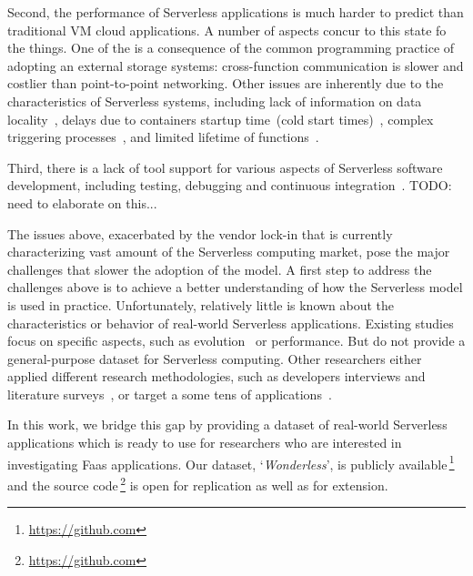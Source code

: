 Second, the performance of Serverless applications is much harder to 
predict than traditional VM cloud applications. A number of aspects concur 
to this state fo the things.
One of the is a consequence of the common programming practice
of adopting an external storage systems: cross-function communication 
is slower and costlier than point-to-point networking.
Other issues are inherently due to the characteristics of Serverless systems,
including lack of information on data locality~\cite{DBLP:journals/corr/abs-1902-03383},
delays due to containers startup time~(cold start times)~\cite{manner2018cold}, 
complex triggering processes~\cite{pelle2019towards}, and
limited lifetime of functions~\cite{hellerstein2018serverless}.

Third, there is a lack of tool support for various aspects of
Serverless software development, including testing, debugging 
and continuous integration~\cite{lenarduzzi2020serverless}.
TODO: need to elaborate on this...

The issues above, exacerbated by the vendor lock-in that is currently 
characterizing vast amount of the Serverless computing market, 
pose the major challenges that slower the adoption of the \faas model. 
A first step to address the challenges above is to achieve a 
better understanding of how the Serverless model is used in practice. 
Unfortunately, relatively little is known about the characteristics 
or behavior of real-world Serverless applications. Existing studies focus 
on specific aspects, such as evolution~\cite{spillner2019quantitative} 
or performance\cite{wang2018peeking,lloyd2018serverless}.
But do not provide a general-purpose dataset for Serverless computing.
Other researchers either applied different research methodologies, 
such as developers interviews and literature surveys~\cite{leitner2019mixed},
or target a some tens of applications~\cite{eismann2020serverless}.


In this work, we bridge this gap by providing a dataset of real-world Serverless 
applications which is ready to use for researchers who are interested in investigating
Faas applications. Our dataset, `\emph{Wonderless}', is publicly 
available\,\footnote{\url{https://github.com}} 
and the source code\,\footnote{\url{https://github.com}} 
is open for replication as well as for extension.











